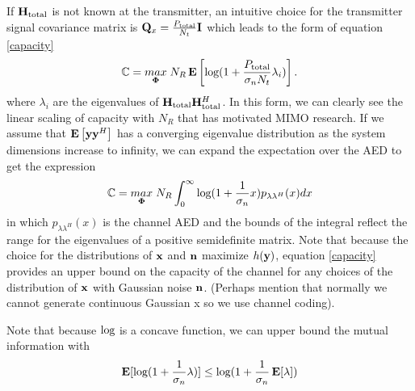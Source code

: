 If $\mathbf{H}_\text{total}$ is not known at the transmitter, an intuitive choice for the transmitter signal covariance matrix is  $\mathbf{Q}_x = \frac{P_{\text{total}}}{N_t}\mathbf{I}$ which leads to the form of equation \eqref{capacity}
\begin{equation}\label{no_csi_capacity}
\mathbb{C} = \underset{\boldsymbol{\Phi}}{\mathop{max}} \; N_R \mathop{\bf E{}} \left[\text{log{}}(1 + \frac{P_{\text{total}}}{\sigma_nN_t}\lambda_i)\right].
\end{equation}
where $\lambda_i$ are the eigenvalues of $\mathbf{H}_\text{total} \mathbf{H}_\text{total}^H$.
In this form, we can clearly see the linear scaling of capacity with $N_R$ that has motivated MIMO research.
If we assume that $\mathop{\bf E{}}\left[ \mathbf{y} \mathbf{y}^H \right]$ has a converging eigenvalue distribution as the system dimensions increase to infinity, we can expand the expectation over the AED to get the expression
\begin{equation}\label{no_csi_capacity_aed}
\mathbb{C} = \underset{\boldsymbol{\Phi}}{\mathop{max}} \; N_R  \int_{0}^{\infty}\text{log{}}(1 + \frac{1}{\sigma_n}x)p_{\lambda\lambda^H}(x) dx
\end{equation}
in which $p_{\lambda\lambda^H}(x)$ is the channel AED and the bounds of the integral reflect the range for the eigenvalues of a positive semidefinite matrix.
Note that because the choice for the distributions of $\mathbf{x}$ and $\mathbf{n}$ maximize $h(\mathbf{y})$, equation \eqref{capacity} provides an upper bound on the capacity of the channel for any choices of the distribution of $\mathbf{x} $ with Gaussian noise $\mathbf{n}$. (Perhaps mention that normally we cannot generate continuous Gaussian x so we use channel coding).


Note that because $\text{log{}}$ is a concave function, we can upper bound the mutual information with
\begin{equation}\label{mut_inf}
\mathop{\bf E{}}[\text{log{}}(1 + \frac{1}{\sigma_n}\lambda)] \leq \text{log{}}(1 + \frac{1}{\sigma_n}\mathop{\bf E{}}[\lambda])
\end{equation}